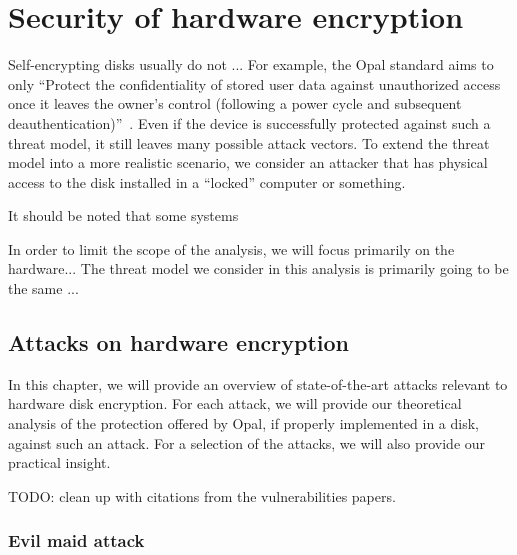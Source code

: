 \chapter{Security of hardware encryption}

Self-encrypting disks usually do not ...
For example, the Opal standard aims to only \enquote{Protect the confidentiality of stored user data against unauthorized access once it leaves the owner's control (following a power cycle and subsequent deauthentication)}~\cite{tcg-opal2}.
Even if the device is successfully protected against such a threat model, it still leaves many possible attack vectors.
To extend the threat model into a more realistic scenario, we consider an attacker that has physical access to the disk installed in a ``locked'' computer or something.

It should be noted that some systems 

In order to limit the scope of the analysis, we will focus primarily on the hardware...
The threat model we consider in this analysis is primarily going to be the same ...



\section{Attacks on hardware encryption}

In this chapter, we will provide an overview of state-of-the-art attacks relevant to hardware disk encryption. For each attack, we will provide our theoretical analysis of the protection offered by Opal, if properly implemented in a disk, against such an attack. For a selection of the attacks, we will also provide our practical insight.

TODO: clean up with citations from the vulnerabilities papers\cite{bypassing_in_enterprise, got_hw_crypto, sed-vulnerabilities, self_decrypting_risks, self_encrypting_deception, systematic_assessment_of_the_security}.


\subsection{Evil maid attack}

